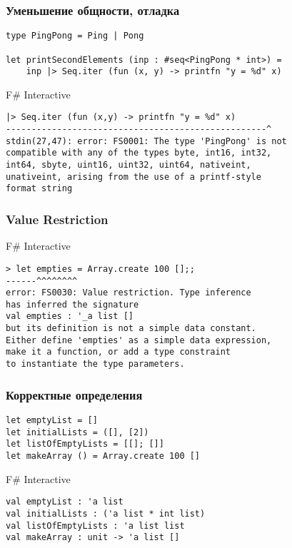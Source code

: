 \documentclass[xetex,mathserif,serif]{beamer}
\begin{document}
    \begin{frame}[fragile]
        \frametitle{Уменьшение общности, отладка}
        \begin{verbatim}
type PingPong = Ping | Pong

let printSecondElements (inp : #seq<PingPong * int>) =
    inp |> Seq.iter (fun (x, y) -> printfn "y = %d" x)
        \end{verbatim}

        \begin{alertblock}{F\# Interactive}
            \begin{verbatim}
|> Seq.iter (fun (x,y) -> printfn "y = %d" x)
---------------------------------------------------^
stdin(27,47): error: FS0001: The type 'PingPong' is not 
compatible with any of the types byte, int16, int32, 
int64, sbyte, uint16, uint32, uint64, nativeint, 
unativeint, arising from the use of a printf-style 
format string
            \end{verbatim}
        \end{alertblock}
    \end{frame}

    \begin{frame}[fragile]
        \frametitle{Value Restriction}
        \begin{alertblock}{F\# Interactive}
            \begin{verbatim}
> let empties = Array.create 100 [];;
------^^^^^^^^
error: FS0030: Value restriction. Type inference 
has inferred the signature 
val empties : '_a list []
but its definition is not a simple data constant. 
Either define 'empties' as a simple data expression, 
make it a function, or add a type constraint 
to instantiate the type parameters.
            \end{verbatim}
        \end{alertblock}
    \end{frame}

    \begin{frame}[fragile]
        \frametitle{Корректные определения}
        \begin{verbatim}
let emptyList = []
let initialLists = ([], [2])
let listOfEmptyLists = [[]; []]
let makeArray () = Array.create 100 []
        \end{verbatim}
        
        \begin{alertblock}{F\# Interactive}
            \begin{verbatim}
val emptyList : 'a list
val initialLists : ('a list * int list)
val listOfEmptyLists : 'a list list
val makeArray : unit -> 'a list []
            \end{verbatim}
        \end{alertblock}
    \end{frame}
\end{document}
